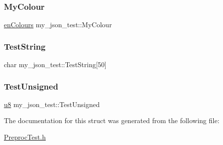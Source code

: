\subsubsection{\texorpdfstring{My\+Colour}{MyColour}}
{\footnotesize\ttfamily \hyperlink{PreprocTest_8h_a081cf1a0e70d6e2bd48c98f457742877}{en\+Colours} my\+\_\+json\+\_\+test\+::\+My\+Colour}

\mbox{\label{structmy__json__test_a497da009ff7ce7742cf99571b0752227}} 
\subsubsection{\texorpdfstring{Test\+String}{TestString}}
{\footnotesize\ttfamily char my\+\_\+json\+\_\+test\+::\+Test\+String\mbox{[}50\mbox{]}}

\mbox{\label{structmy__json__test_a0ea8af0c0061131955753275ad70dba4}} 
\subsubsection{\texorpdfstring{Test\+Unsigned}{TestUnsigned}}
{\footnotesize\ttfamily \hyperlink{ab__common_8h_a92c50087ca0e64fa93fc59402c55f8ca}{u8} my\+\_\+json\+\_\+test\+::\+Test\+Unsigned}



The documentation for this struct was generated from the following file\+:\begin{DoxyCompactItemize}
\item 
\hyperlink{PreprocTest_8h}{Preproc\+Test.\+h}\end{DoxyCompactItemize}
